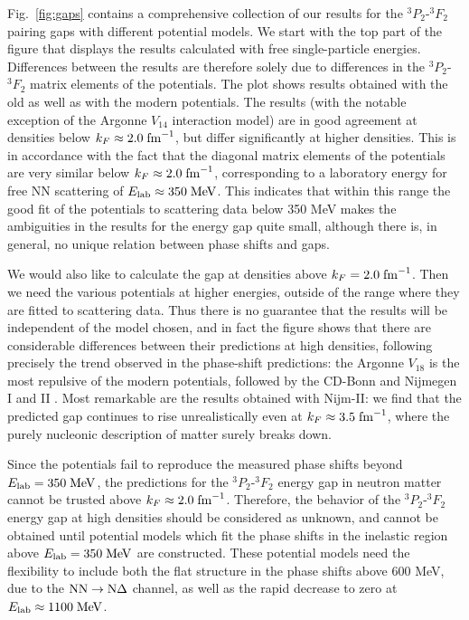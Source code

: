 \documentclass[rmp,aps,floatfix]{revtex4}
\begin{document}
Fig.~\ref{fig:gaps} contains a comprehensive collection of our results for
the $^3P_2$-$^3F_2$ pairing gaps with different potential models. 
We start with the top part of the figure that displays the results
calculated with free single-particle energies.  
Differences between the results are therefore solely due to differences 
in the $^3P_2$-$^3F_2$ matrix elements of the potentials.
The plot shows results obtained with the old as well as with the modern
potentials.
The results (with the notable exception of 
the Argonne $V_{14}$ interaction model)
are in good agreement at densities below $k_F\approx 2.0\;{\rm fm}^{-1}$, 
but differ significantly at higher densities.  
This is in accordance with the fact that 
the diagonal matrix elements of the potentials are very similar 
below $k_F\approx 2.0\;{\rm fm}^{-1}$, corresponding  
to a laboratory energy for free NN scattering 
of $E_{\rm lab} \approx 350\;{\rm MeV}$.  
This indicates that
within this range the good fit of the potentials 
to scattering data below 350 MeV makes the ambiguities in the 
results for the energy gap quite small,
although there is, in general, no unique relation between phase shifts and gaps.

We would also like to calculate the gap at densities above 
$k_F=2.0\;{\rm fm}^{-1}$.  
Then we need the various potentials at higher energies, 
outside of the range where they are fitted to scattering data.  
Thus there is no guarantee that 
the results will be independent of the model chosen, and in fact 
the figure shows that there are considerable differences 
between their predictions at high densities,
following precisely the trend observed in the phase-shift predictions:
the Argonne $V_{18}$ is the most repulsive of the modern potentials,
followed by the CD-Bonn \cite{cdbonn96} and Nijmegen I and II 
\cite{nijmegen94}.
Most remarkable are the results obtained with Nijm-II: 
we find that the predicted gap 
continues to rise unrealistically even at $k_F \approx 3.5\;{\rm fm}^{-1}$, 
where the purely nucleonic description of matter surely breaks down.

Since the potentials fail to reproduce the measured phase shifts 
beyond $E_{\rm lab}=350\;{\rm MeV}$, the predictions for the $^3P_2$-$^3F_2$ 
energy gap in neutron matter cannot be trusted above 
$k_F\approx 2.0\;{\rm fm}^{-1}$.  
Therefore, the behavior of the $^3P_2$-$^3F_2$ energy gap at high densities 
should be considered as unknown, and cannot be obtained until potential models 
which fit the phase shifts in the inelastic region 
above $E_{\rm lab}=350\;{\rm MeV}$ are constructed.  
These potential models need the flexibility to 
include both the flat structure in the phase shifts above 600 MeV, 
due to the ${\rm NN}\rightarrow{\rm N}\Delta$ channel, as well as the 
rapid decrease to zero at $E_{\rm lab}\approx 1100\;{\rm MeV}$.  
 
\end{document}

